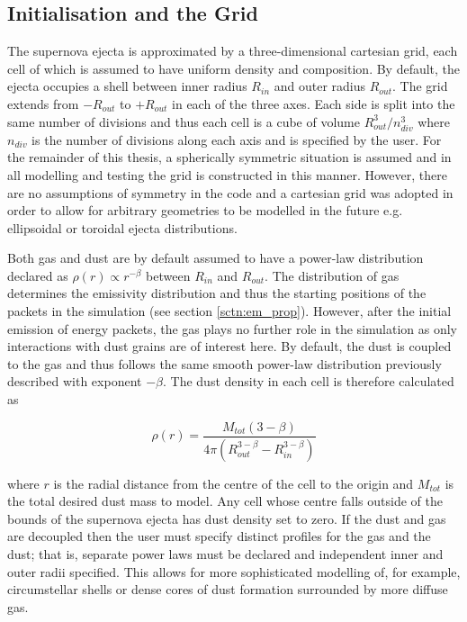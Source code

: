 	\subsection{Initialisation and the Grid}
	
	The supernova ejecta is approximated by a three-dimensional cartesian grid, each cell of which is assumed to have uniform density and composition.  By default, the ejecta occupies a shell between inner radius $R_{in}$ and outer radius $R_{out}$. The grid extends from $-R_{out}$ to $+R_{out}$ in each of the three axes.  Each side is split into the same number of divisions and thus each cell is a cube of volume $R_{out}^3/n_{div}^3$ where $n_{div}$ is the number of divisions along each axis and is specified by the user.  For the remainder of this thesis, a spherically symmetric situation is assumed and in all modelling and testing the grid is constructed in this manner.  However, there are no assumptions of symmetry in the code and a cartesian grid was adopted in order to allow for arbitrary geometries to be modelled in the future e.g. ellipsoidal or toroidal ejecta distributions.
	
	  Both gas and dust are by default assumed to have a power-law distribution declared as  $\rho(r) \propto r^{-\beta}$ between $R_{in}$ and $R_{out}$.  The distribution of gas determines the emissivity distribution and thus the starting positions of the packets in the simulation (see section \ref{sctn:em_prop}).  However, after the initial emission of energy packets, the gas plays no further role in the simulation as only interactions with dust grains are of interest here.  By default, the dust is coupled to the gas and thus follows the same smooth power-law distribution previously described with exponent $-\beta$.  The dust density in each cell is therefore calculated as
	
\begin{equation}
\rho (r)= \frac{M_{tot}(3-\beta)}{4\pi (R_{out}^{3-\beta}-R_{in}^{3-\beta})}
\end{equation}
	
	
\noindent where $r$ is the radial distance from the centre of the cell to the origin and $M_{tot}$ is the total desired dust mass to model.  Any cell whose centre falls outside of the bounds of the supernova ejecta has dust density set to zero.  If the dust and gas are decoupled then the user must specify distinct profiles for the gas and the dust; that is, separate power laws must be declared and independent inner and outer radii specified.  This allows for more sophisticated modelling of, for example, circumstellar shells or dense cores of dust formation surrounded by more diffuse gas.


